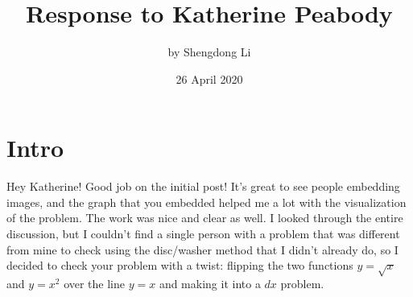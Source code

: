 \documentclass[letterpaper, 12pt]{article}
\begin{document}
\title{Response to Katherine Peabody}
\author{by Shengdong Li}
\date{26 April 2020}
\maketitle

\section{Intro}
Hey Katherine! Good job on the initial post! It's great to see people embedding images, and the graph that you embedded helped me a lot with the visualization of the problem. The work was nice and clear as well. I looked through the entire discussion, but I couldn't find a single person with a problem that was different from mine to check using the disc/washer method that I didn't already do, so I decided to check your problem with a twist: flipping the two functions $y=\sqrt{x}$ and $y=x^2$ over the line $y=x$ and making it into a $dx$ problem.
\end{document}
